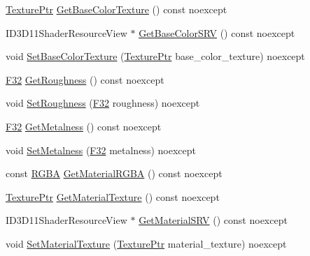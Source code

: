 \begin{DoxyCompactItemize}
\hyperlink{namespacemage_1_1rendering_a6f3ae54f825328465b0cdde0f0de4a36}{Texture\+Ptr} \hyperlink{classmage_1_1rendering_1_1_material_ac9ce1aff5b5e3d34ae83eb194786cebe}{Get\+Base\+Color\+Texture} () const noexcept
\item 
I\+D3\+D11\+Shader\+Resource\+View $\ast$ \hyperlink{classmage_1_1rendering_1_1_material_a363d85135b18e4e8c8a0b1d2fd88a435}{Get\+Base\+Color\+S\+RV} () const noexcept
\item 
void \hyperlink{classmage_1_1rendering_1_1_material_aae6ebdb492e06a39e1f420154962ab0f}{Set\+Base\+Color\+Texture} (\hyperlink{namespacemage_1_1rendering_a6f3ae54f825328465b0cdde0f0de4a36}{Texture\+Ptr} base\+\_\+color\+\_\+texture) noexcept
\item 
\hyperlink{namespacemage_aa97e833b45f06d60a0a9c4fc22ae02c0}{F32} \hyperlink{classmage_1_1rendering_1_1_material_a4c950a1b95e14246027de8ff0da4d55a}{Get\+Roughness} () const noexcept
\item 
void \hyperlink{classmage_1_1rendering_1_1_material_a1504fb6523526ee9897b20851a3b84e9}{Set\+Roughness} (\hyperlink{namespacemage_aa97e833b45f06d60a0a9c4fc22ae02c0}{F32} roughness) noexcept
\item 
\hyperlink{namespacemage_aa97e833b45f06d60a0a9c4fc22ae02c0}{F32} \hyperlink{classmage_1_1rendering_1_1_material_aaa4265533437b462e2f2087cfa37e623}{Get\+Metalness} () const noexcept
\item 
void \hyperlink{classmage_1_1rendering_1_1_material_a46b3297fb948c4fec3447caa35f96918}{Set\+Metalness} (\hyperlink{namespacemage_aa97e833b45f06d60a0a9c4fc22ae02c0}{F32} metalness) noexcept
\item 
const \hyperlink{structmage_1_1_r_g_b_a}{R\+G\+BA} \hyperlink{classmage_1_1rendering_1_1_material_a0464566ef674bf074d0af22e852daaa3}{Get\+Material\+R\+G\+BA} () const noexcept
\item 
\hyperlink{namespacemage_1_1rendering_a6f3ae54f825328465b0cdde0f0de4a36}{Texture\+Ptr} \hyperlink{classmage_1_1rendering_1_1_material_aa396990a630c749a46a8a9fc88e80683}{Get\+Material\+Texture} () const noexcept
\item 
I\+D3\+D11\+Shader\+Resource\+View $\ast$ \hyperlink{classmage_1_1rendering_1_1_material_ae1e1f712801dd1f16a695692df4f4f23}{Get\+Material\+S\+RV} () const noexcept
\item 
void \hyperlink{classmage_1_1rendering_1_1_material_a6bf886a16cbe84c55664701ab3a82658}{Set\+Material\+Texture} (\hyperlink{namespacemage_1_1rendering_a6f3ae54f825328465b0cdde0f0de4a36}{Texture\+Ptr} material\+\_\+texture) noexcept

\end{DoxyCompactItemize}
